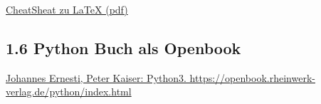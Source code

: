 \documentclass[
  11pt,
  a4paper,
  DIV=11,
  numbers=noendperiod]{scrartcl}
\begin{document}
\href{1_Programming_Introduction/1_Python_Programming/1-1_Setup/1-1_Markdown_LaTeX_CheatSheet.pdf}{CheatSheat
zu LaTeX (pdf)}

\subsection{1.6 Python Buch als
Openbook}\label{python-buch-als-openbook}

\href{https://openbook.rheinwerk-verlag.de/python/index.html}{Johannes
Ernesti, Peter Kaiser: Python3.
https://openbook.rheinwerk-verlag.de/python/index.html}
\end{document}
